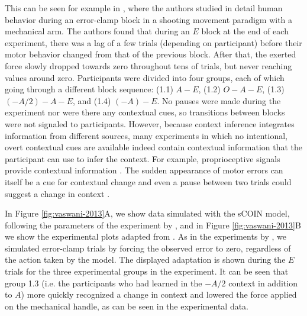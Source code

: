 \documentclass[a4paper,doc,floatsintext,natbib]{apa6}
\def \fref #1{Figure \ref{#1}}     %
\begin{document}
This can be seen for example in \citep{Vaswani_Decay_2013}, where the authors studied in detail human behavior during an error-clamp block in a shooting movement paradigm with a mechanical arm. The authors found that during an $E$ block at the end of each experiment, there was a lag of a few trials (depending on participant) before their motor behavior changed from that of the previous block. After that, the exerted force slowly dropped towards zero throughout tens of trials, but never reaching values around zero. Participants were divided into four groups, each of which going through a different block sequence: (1.1) $A-E$, (1.2) $O-A-E$, (1.3) $(-A/2)-A-E$, and (1.4) $(-A)-E$. No pauses were made during the experiment nor were there any contextual cues, so transitions between blocks were not signaled to participants. However, because context inference integrates information from different sources, many experiments in which no intentional, overt contextual cues are available indeed contain contextual information that the participant can use to infer the context. For example, proprioceptive signals provide contextual information \citep{Dizio_Motor_1995,Shadmehr_Adaptive_1994}. The sudden appearance of motor errors can itself be a cue for contextual change \citep{Herzfeld_memory_2014} and even a pause between two trials could suggest a change in context \citep{Ethier_Spontaneous_2008}.

In \fref{fig:vaswani-2013}A, we show data simulated with the sCOIN model, following the parameters of the experiment by \cite{Vaswani_Decay_2013}, and in \fref{fig:vaswani-2013}B we show the experimental plots adapted from \cite{Vaswani_Decay_2013}. As in the experiments by \cite{Vaswani_Decay_2013}, we simulated error-clamp trials by forcing the observed error to zero, regardless of the action taken by the model. The displayed adaptation is shown during the $E$ trials for the three experimental groups in the experiment. It can be seen that group 1.3 (i.e. the participants who had learned in the $-A/2$ context in addition to $A$) more quickly recognized a change in context and lowered the force applied on the mechanical handle, as can be seen in the experimental data.
\end{document}
